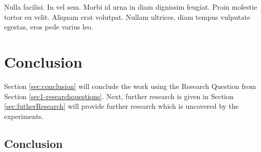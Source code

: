 \begin{savequote}[75mm] 
Nulla facilisi. In vel sem. Morbi id urna in diam dignissim feugiat. Proin molestie tortor eu velit. Aliquam erat volutpat. Nullam ultrices, diam tempus vulputate egestas, eros pede varius leo.
\end{savequote}


\chapter{Conclusion}

Section \ref{sec:conclusion} will conclude the work using the Research Question from Section \ref{sec1-researchquestions}. Next, further research is given in Section \ref{sec:futherResearch} will provide further research which is uncovered by the experiments.

\section{Conclusion \label{sec:conclusion}}

